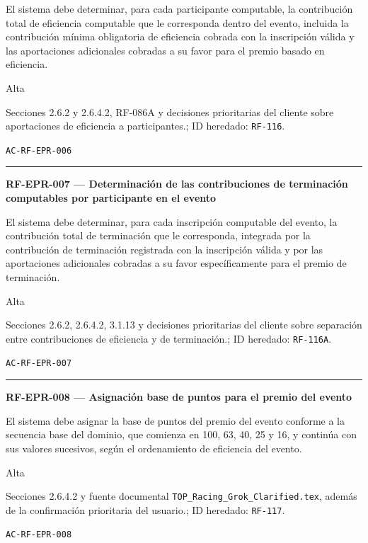 \documentclass[10pt,letterpaper]{article}
\begin{document}
\begin{description}[style=nextline,leftmargin=3.15cm,labelwidth=2.8cm,font=\normalfont\bfseries]
\item[Obligación] El sistema debe determinar, para cada participante computable, la contribución total de eficiencia computable que le corresponda dentro del evento, incluida la contribución mínima obligatoria de eficiencia cobrada con la inscripción válida y las aportaciones adicionales cobradas a su favor para el premio basado en eficiencia.
\item[Prioridad] Alta
\item[Procedencia] Secciones 2.6.2 y 2.6.4.2, RF-086A y decisiones prioritarias del cliente sobre aportaciones de eficiencia a participantes.; ID heredado: \texttt{RF-116}.
\item[Verificación] \texttt{AC-RF-EPR-006}
\end{description}
\vspace{0.25em}\hrule\vspace{0.65em}
\noindent\textbf{RF-EPR-007 --- Determinación de las contribuciones de terminación computables por participante en el evento}\par
\begin{description}[style=nextline,leftmargin=3.15cm,labelwidth=2.8cm,font=\normalfont\bfseries]
\item[Obligación] El sistema debe determinar, para cada inscripción computable del evento, la contribución total de terminación que le corresponda, integrada por la contribución de terminación registrada con la inscripción válida y por las aportaciones adicionales cobradas a su favor específicamente para el premio de terminación.
\item[Prioridad] Alta
\item[Procedencia] Secciones 2.6.2, 2.6.4.2, 3.1.13 y decisiones prioritarias del cliente sobre separación entre contribuciones de eficiencia y de terminación.; ID heredado: \texttt{RF-116A}.
\item[Verificación] \texttt{AC-RF-EPR-007}
\end{description}
\vspace{0.25em}\hrule\vspace{0.65em}
\noindent\textbf{RF-EPR-008 --- Asignación base de puntos para el premio del evento}\par
\begin{description}[style=nextline,leftmargin=3.15cm,labelwidth=2.8cm,font=\normalfont\bfseries]
\item[Obligación] El sistema debe asignar la base de puntos del premio del evento conforme a la secuencia base del dominio, que comienza en 100, 63, 40, 25 y 16, y continúa con sus valores sucesivos, según el ordenamiento de eficiencia del evento.
\item[Prioridad] Alta
\item[Procedencia] Secciones 2.6.4.2 y fuente documental \texttt{TOP\_Racing\_Grok\_Clarified.tex}, además de la confirmación prioritaria del usuario.; ID heredado: \texttt{RF-117}.
\item[Verificación] \texttt{AC-RF-EPR-008}
\end{description}
\end{document}
